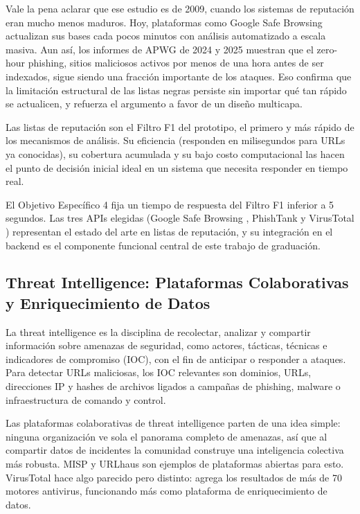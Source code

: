 Vale la pena aclarar que ese estudio es de 2009, cuando los sistemas de reputaci\'on eran mucho menos maduros. Hoy, plataformas como Google Safe Browsing actualizan sus bases cada pocos minutos con an\'alisis automatizado a escala masiva. Aun as\'i, los informes de APWG de 2024 y 2025 \cite{apwg2024q1,apwg2025q1} muestran que el zero-hour phishing, sitios maliciosos activos por menos de una hora antes de ser indexados, sigue siendo una fracci\'on importante de los ataques. Eso confirma que la limitaci\'on estructural de las listas negras persiste sin importar qu\'e tan r\'apido se actualicen, y refuerza el argumento a favor de un dise\~no multicapa.

Las listas de reputaci\'on son el Filtro F1 del prototipo, el primero y m\'as r\'apido de los mecanismos de an\'alisis. Su eficiencia (responden en milisegundos para URLs ya conocidas), su cobertura acumulada y su bajo costo computacional las hacen el punto de decisi\'on inicial ideal en un sistema que necesita responder en tiempo real.

El Objetivo Espec\'ifico 4 fija un tiempo de respuesta del Filtro F1 inferior a 5 segundos. Las tres APIs elegidas (Google Safe Browsing \cite{google_safebrowsing}, PhishTank \cite{phishtank_devinfo} y VirusTotal \cite{virustotal_apiv3}) representan el estado del arte en listas de reputaci\'on, y su integraci\'on en el backend es el componente funcional central de este trabajo de graduaci\'on.

\subsection{Threat Intelligence: Plataformas Colaborativas y Enriquecimiento de Datos}

La threat intelligence es la disciplina de recolectar, analizar y compartir informaci\'on sobre amenazas de seguridad, como actores, t\'acticas, t\'ecnicas e indicadores de compromiso (IOC), con el fin de anticipar o responder a ataques. Para detectar URLs maliciosas, los IOC relevantes son dominios, URLs, direcciones IP y hashes de archivos ligados a campa\~nas de phishing, malware o infraestructura de comando y control.

Las plataformas colaborativas de threat intelligence parten de una idea simple: ninguna organizaci\'on ve sola el panorama completo de amenazas, as\'i que al compartir datos de incidentes la comunidad construye una inteligencia colectiva m\'as robusta. MISP \cite{misp_project} y URLhaus \cite{urlhaus_api} son ejemplos de plataformas abiertas para esto. VirusTotal \cite{virustotal_apiv3} hace algo parecido pero distinto: agrega los resultados de m\'as de 70 motores antivirus, funcionando m\'as como plataforma de enriquecimiento de datos.

